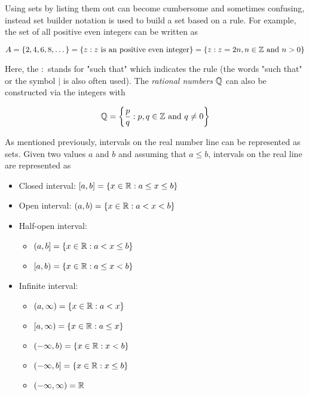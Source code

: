 Using sets by listing them out can become cumbersome and sometimes confusing, instead set builder notation is used to build a set based on a rule. For example, the set of all positive even integers can be written as

\begin{equation}
    A = \{2,4,6,8,\dots\} = \{z : z \text{ is an positive even integer}\} = \{z : z = 2n, n\in\mathbb{Z} \text{ and } n > 0\}
\end{equation}

\noindent Here, the $:$ stands for "such that" which indicates the rule (the words "such that" or the symbol $|$ is also often used). The \textit{rational numbers} $\mathbb{Q}$ can also be constructed via the integers with

\begin{equation}
    \mathbb{Q} = \left\{\frac{p}{q} : p,q \in \mathbb{Z} \text{ and } q \neq 0\right\}
\end{equation}

As mentioned previously, intervals on the real number line can be represented as sets. Given two values $a$ and $b$ and assuming that $a \leq b$, intervals on the real line are represented as

\begin{itemize}
    \item Closed interval: $[a,b] = \{x \in \mathbb{R} : a \leq x \leq b\}$ \hfill {}
    \item Open interval: $(a,b) = \{x \in \mathbb{R} : a < x < b\}$ \hfill {}
    \item Half-open interval:
        \begin{itemize}
            \item $(a,b] = \{x \in \mathbb{R} : a < x \leq b\}$ \hfill \intervalinline{a}{b}{(}{]}
            \item $[a,b) = \{x \in \mathbb{R} : a \leq x < b\}$ \hfill \intervalinline{a}{b}{[}{)}
        \end{itemize}
    \item Infinite interval:
        \begin{itemize}
            \item $(a,\infty) = \{x \in \mathbb{R}: a < x\}$ \hfill {}
                \item $[a,\infty) = \{x \in \mathbb{R}: a \leq x\}$ \hfill \intervalinline{a}{$\infty$}{[}{}
                \item $(-\infty,b) = \{x \in \mathbb{R}: x < b\}$ \hfill {}
            \item $(-\infty,b] = \{x \in \mathbb{R}: x \leq b\}$ \hfill \intervalinline{$-\infty$}{b}{}{]}
            \item $(-\infty,\infty) = \mathbb{R}$ \hfill \intervalinline{$-\infty$}{$\infty$}{}{}
        \end{itemize}
\end{itemize}

